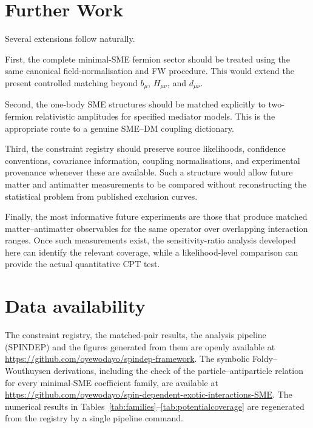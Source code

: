 \documentclass[aps,prd,reprint,superscriptaddress,nofootinbib]{revtex4-2}
\begin{document}
	\section{Further Work}
	
	Several extensions follow naturally.
	
	First, the complete minimal-SME fermion sector should be treated using
	the same canonical field-normalisation and FW procedure. This would
	extend the present controlled matching beyond $b_\mu$, $H_{\mu\nu}$,
	and $d_{\mu\nu}$.
	
	Second, the one-body SME structures should be matched explicitly to
	two-fermion relativistic amplitudes for specified mediator models.
	This is the appropriate route to a genuine SME--DM coupling dictionary.
	
	Third, the constraint registry should preserve source likelihoods,
	confidence conventions, covariance information, coupling
	normalisations, and experimental provenance whenever these are
	available. Such a structure would allow future matter and antimatter
	measurements to be compared without reconstructing the statistical
	problem from published exclusion curves.
	
	Finally, the most informative future experiments are those that produce
	matched matter--antimatter observables for the same operator over
	overlapping interaction ranges. Once such measurements exist, the
	sensitivity-ratio analysis developed here can identify the relevant
	coverage, while a likelihood-level comparison can provide the actual
	quantitative CPT test.
	
\section*{Data availability}

{\raggedright
The constraint registry, the matched-pair results, the analysis
pipeline (SPINDEP) and the figures generated from them are openly
available at \url{https://github.com/oyewodayo/spindep-framework}. The
symbolic Foldy--Wouthuysen derivations, including the check of the
particle--antiparticle relation for every minimal-SME coefficient
family, are available at
\url{https://github.com/oyewodayo/spin-dependent-exotic-interactions-SME}.
The numerical results in Tables~\ref{tab:families}--\ref{tab:potentialcoverage}
are regenerated from the registry by a single pipeline command.\par}
\end{document}
